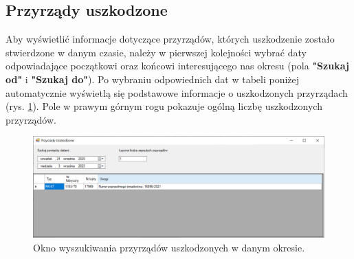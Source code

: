\subsection{Przyrządy uszkodzone}
\label{uszkodzone}

Aby wyświetlić informacje dotyczące przyrządów, których uszkodzenie zostało stwierdzone w danym czasie, należy w pierwszej kolejności wybrać daty odpowiadające początkowi oraz końcowi interesującego nas okresu (pola \textbf{"Szukaj od"} i \textbf{"Szukaj do"}). Po wybraniu odpowiednich dat w tabeli poniżej automatycznie wyświetlą się podstawowe informacje o uszkodzonych przyrządach (rys. \ref{przyrzadyUszkodzone}).  Pole w prawym górnym rogu pokazuje ogólną liczbę uszkodzonych przyrządów.

\begin{figure}[htb]
	\centering
	\includegraphics[width=\columnwidth]{obrazki/Wyszukiwanie/przyrzady_uszkodzone.png}
	\caption{Okno wyszukiwania przyrządów uszkodzonych w danym okresie.}
	\label{przyrzadyUszkodzone}
\end{figure}